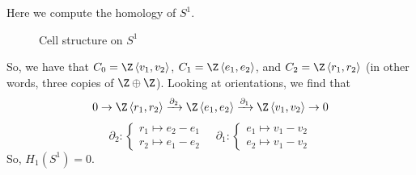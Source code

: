 \begin{example}
    Here we compute the homology of $S^1$.
	\begin{figure}[H]
		\centering
		\caption{Cell structure on $S^1$}
		\label{fig:cell-structure-on-s1}
	\end{figure}
	So, we have that $C_0 = \Z\left< v_1,v_2 \right>$, $C_1 = \Z\left< e_1,e_2 \right>$, and $C_2 = \Z\left< r_1,r_2 \right>$ (in other words, three copies of $\Z \oplus \Z$). Looking at orientations, we find that \[0 \to \Z\left< r_1,r_2 \right> \xrightarrow{\partial_2} \Z\left< e_1,e_2 \right> \xrightarrow{\partial_1} \Z\left< v_1,v_2 \right> \to 0\] \[\partial_2 : \begin{cases}
			r_1 \mapsto e_2 - e_1\\
			r_2 \mapsto e_1 - e_2
		\end{cases}
		\quad
		\partial_1 : \begin{cases}
			e_1 \mapsto v_1 - v_2\\
			e_2 \mapsto v_1 - v_2
		\end{cases}
	\] So, $H_1(S^1) = 0$.
\end{example}

